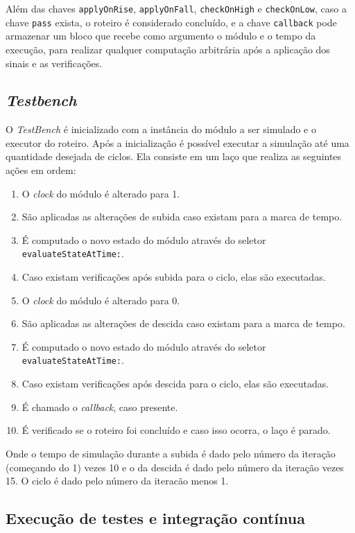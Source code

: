 Além das chaves \texttt{applyOnRise}, \texttt{applyOnFall}, \texttt{checkOnHigh} e \texttt{checkOnLow}, caso a chave
\texttt{pass} exista, o roteiro é considerado concluído, e a chave \texttt{callback}
pode armazenar um bloco que recebe como argumento o módulo e o tempo da execução, para realizar qualquer computação arbitrária após a
aplicação dos sinais e as verificações.

\subsection{\emph{Testbench}}
\label{ssec:bench}

O \emph{TestBench} é inicializado com a instância do módulo a ser simulado e o executor do roteiro.
Após a inicialização é possível executar a simulação até uma quantidade desejada de ciclos.
Ela consiste em um laço que realiza as seguintes ações em ordem:
\begin{enumerate}
  \item O \emph{clock} do módulo é alterado para 1.
  \item São aplicadas as alterações de subida caso existam para a marca de tempo.
  \item É computado o novo estado do módulo através do seletor \texttt{evaluateStateAtTime:}.
  \item Caso existam verificações após subida para o ciclo, elas são executadas.
  \item O \emph{clock} do módulo é alterado para 0.
  \item São aplicadas as alterações de descida caso existam para a marca de tempo.
  \item É computado o novo estado do módulo através do seletor \texttt{evaluateStateAtTime:}.
  \item Caso existam verificações após descida para o ciclo, elas são executadas.
  \item É chamado o \emph{callback}, caso presente.
  \item É verificado se o roteiro foi concluído e caso isso ocorra, o laço é parado.
\end{enumerate}

Onde o tempo de simulação durante a subida é dado pelo número da iteração
(começando do 1) vezes 10 e o da descida é dado pelo número da iteração
vezes 15. O ciclo é dado pelo número da iteracão menos 1.

\subsection{Execução de testes e integração contínua}
\label{sec:edt}

